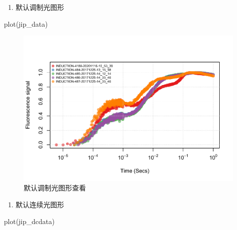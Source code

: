 \documentclass[
]{krantz}
\makeatletter
\newenvironment{Shaded}{\begin{snugshade}}{\end{snugshade}}
\newcommand{\FunctionTok}[1]{\textcolor[rgb]{0.00,0.00,0.00}{#1}}
\newcommand{\NormalTok}[1]{#1}
\providecommand{\tightlist}{%
  \setlength{\itemsep}{0pt}\setlength{\parskip}{0pt}}
\newenvironment{kframe}{%
\medskip{}
\setlength{\fboxsep}{.8em}
 \def\at@end@of@kframe{}%
 \ifinner\ifhmode%
  \def\at@end@of@kframe{\end{minipage}}%
  \begin{minipage}{\columnwidth}%
 \fi\fi%
 \def\FrameCommand##1{\hskip\@totalleftmargin \hskip-\fboxsep
 \colorbox{shadecolor}{##1}\hskip-\fboxsep
     \hskip-\linewidth \hskip-\@totalleftmargin \hskip\columnwidth}%
 \MakeFramed {\advance\hsize-\width
   \@totalleftmargin\z@ \linewidth\hsize
   \@setminipage}}%
 {\par\unskip\endMakeFramed%
 \at@end@of@kframe}
\renewenvironment{Shaded}{\begin{kframe}}{\end{kframe}}
\makeatother
\begin{document}
\begin{enumerate}
\def\labelenumi{\arabic{enumi}.}
\tightlist
\item
  默认调制光图形
\end{enumerate}

\begin{Shaded}
\begin{Highlighting}[]
\FunctionTok{plot}\NormalTok{(jip\_data)}
\end{Highlighting}
\end{Shaded}

\begin{figure}
\centering
\includegraphics{bookdown_files/figure-latex/default-moulation-plot-ac-1.pdf}
\caption{\label{fig:default-moulation-plot-ac}默认调制光图形查看}
\end{figure}

\begin{enumerate}
\def\labelenumi{\arabic{enumi}.}
\setcounter{enumi}{1}
\tightlist
\item
  默认连续光图形
\end{enumerate}

\begin{Shaded}
\begin{Highlighting}[]
\FunctionTok{plot}\NormalTok{(jip\_dcdata)}
\end{Highlighting}
\end{Shaded}
\end{document}
